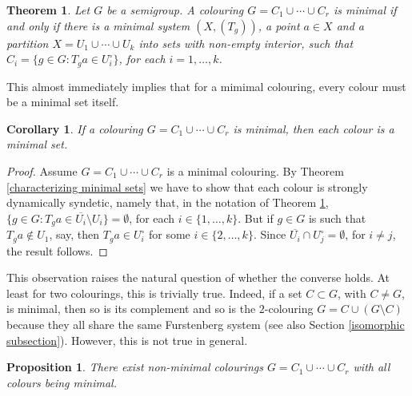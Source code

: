 \documentclass{amsart}
\numberwithin{equation}{section}
\newtheorem{theorem}[lemma]{Theorem}
\newtheorem{corollary}[lemma]{Corollary}
\newtheorem{proposition}[lemma]{Proposition}
\theoremstyle{definition}
\theoremstyle{plain}
\begin{document}
\begin{theorem}\label{minimal colourings}
Let $G$ be a semigroup. A colouring $G=C_1\cup \cdots \cup C_r$ is 
minimal if and only if there is a minimal system $(X,(T_g))$, a point 
$a\in X$ and a partition $X=U_1\cup \cdots \cup U_k$ into sets with non-empty 
interior, such that $C_i=\{g\in G: T_ga\in U_i^{\circ}\}$, for each 
$i=1,\ldots,k$.
\end{theorem}

This almost immediately implies that for a mimimal colouring, every colour 
must be a minimal set itself. 

\begin{corollary}\label{minimal colourings corollary}
If a colouring $G=C_1\cup \cdots \cup C_r$ is 
minimal, then each colour is a minimal set. 
\end{corollary}

\begin{proof}
Assume $G=C_1\cup \cdots \cup C_r$ is a minimal colouring. By Theorem 
\ref{characterizing minimal sets} we have to show that each colour is 
strongly dynamically syndetic, namely that, in the notation of Theorem \ref{minimal colourings}, $\{g\in G: T_ga\in \overline{U_i}\setminus U_i\}=\emptyset$, for each $i\in \{1,\ldots,k\}$. But if $g\in G$ is such that $T_ga\notin U_1$, say, then $T_ga \in U_i^{\circ}$ for some $i\in \{2,\ldots,k\}$. Since $\overline{U_i} \cap U_j^{\circ}=\emptyset$, for $i\neq j$, the result follows. 
\end{proof}

This observation raises the natural question 
of whether the converse holds. At least for two colourings, this is 
trivially true. Indeed, if a set $C\subset G$, with $C\neq G$, is minimal, 
then so is its complement and so is the $2$-colouring 
$G=C \cup (G\setminus C)$ because they all share the same Furstenberg 
system (see also Section \ref{isomorphic subsection}). 
However, this is not true in general. 

\begin{proposition}\label{minimal colours non minimal colouring}
There exist non-minimal colourings $G=C_1\cup \cdots \cup C_r$ with all colours being minimal.    
\end{proposition}
\end{document}
